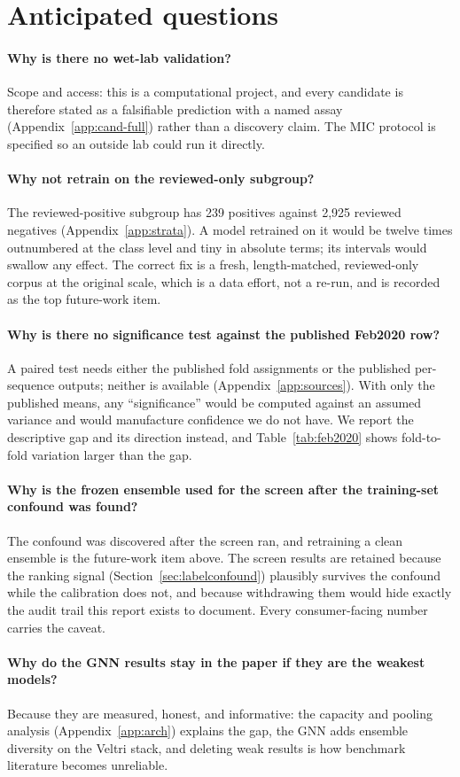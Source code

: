 
\section{Anticipated questions}\label{app:faq}
\paragraph{Why is there no wet-lab validation?}
Scope and access: this is a computational project, and every candidate is
therefore stated as a falsifiable prediction with a named assay
(Appendix~\ref{app:cand-full}) rather than a discovery claim. The MIC
protocol is specified so an outside lab could run it directly.

\paragraph{Why not retrain on the reviewed-only subgroup?}
The reviewed-positive subgroup has 239 positives against 2{,}925 reviewed
negatives (Appendix~\ref{app:strata}). A model retrained on it would be
twelve times outnumbered at the class level and tiny in absolute terms;
its intervals would swallow any effect. The correct fix is a fresh,
length-matched, reviewed-only corpus at the original scale, which is a
data effort, not a re-run, and is recorded as the top future-work item.

\paragraph{Why is there no significance test against the published
Feb2020 row?}
A paired test needs either the published fold assignments or the
published per-sequence outputs; neither is available
(Appendix~\ref{app:sources}). With only the published means, any
``significance'' would be computed against an assumed variance and would
manufacture confidence we do not have. We report the descriptive gap and
its direction instead, and Table~\ref{tab:feb2020} shows fold-to-fold
variation larger than the gap.

\paragraph{Why is the frozen ensemble used for the screen after the
training-set confound was found?}
The confound was discovered after the screen ran, and retraining a clean
ensemble is the future-work item above. The screen results are retained
because the ranking signal (Section~\ref{sec:labelconfound}) plausibly
survives the confound while the calibration does not, and because
withdrawing them would hide exactly the audit trail this report exists to
document. Every consumer-facing number carries the caveat.

\paragraph{Why do the GNN results stay in the paper if they are the
weakest models?}
Because they are measured, honest, and informative: the capacity and
pooling analysis (Appendix~\ref{app:arch}) explains the gap, the GNN adds
ensemble diversity on the Veltri stack, and deleting weak results is how
benchmark literature becomes unreliable.
